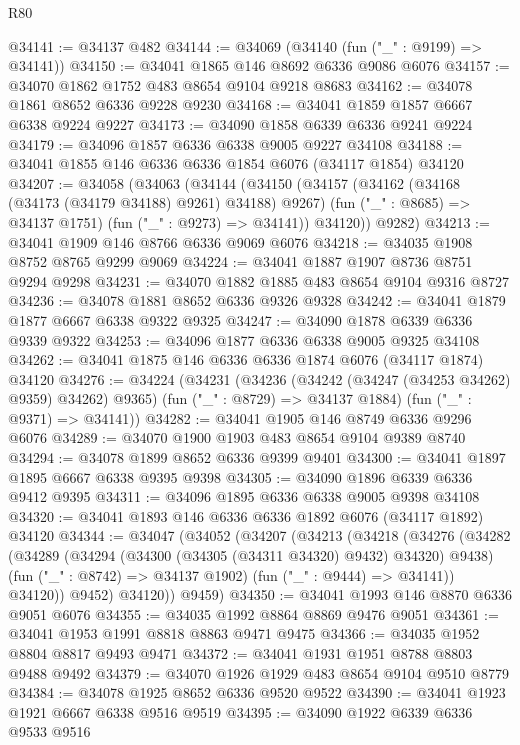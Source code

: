 \begin{lexlean}{R80}
\begin{coremodule}
@34141 := @34137 @482
@34144 := @34069 (@34140 (fun ("_" : @9199) => @34141))
@34150 := @34041 @1865 @146 @8692 @6336 @9086 @6076
@34157 := @34070 @1862 @1752 @483 @8654 @9104 @9218 @8683
@34162 := @34078 @1861 @8652 @6336 @9228 @9230
@34168 := @34041 @1859 @1857 @6667 @6338 @9224 @9227
@34173 := @34090 @1858 @6339 @6336 @9241 @9224
@34179 := @34096 @1857 @6336 @6338 @9005 @9227 @34108
@34188 := @34041 @1855 @146 @6336 @6336 @1854 @6076 (@34117 @1854) @34120
@34207 := @34058
    (@34063
      (@34144
        (@34150
          (@34157
            (@34162 (@34168 (@34173 (@34179 @34188) @9261) @34188) @9267)
            (fun ("_" : @8685) => @34137 @1751)
            (fun ("_" : @9273) => @34141))
          @34120))
      @9282)
@34213 := @34041 @1909 @146 @8766 @6336 @9069 @6076
@34218 := @34035 @1908 @8752 @8765 @9299 @9069
@34224 := @34041 @1887 @1907 @8736 @8751 @9294 @9298
@34231 := @34070 @1882 @1885 @483 @8654 @9104 @9316 @8727
@34236 := @34078 @1881 @8652 @6336 @9326 @9328
@34242 := @34041 @1879 @1877 @6667 @6338 @9322 @9325
@34247 := @34090 @1878 @6339 @6336 @9339 @9322
@34253 := @34096 @1877 @6336 @6338 @9005 @9325 @34108
@34262 := @34041 @1875 @146 @6336 @6336 @1874 @6076 (@34117 @1874) @34120
@34276 := @34224
    (@34231
      (@34236 (@34242 (@34247 (@34253 @34262) @9359) @34262) @9365)
      (fun ("_" : @8729) => @34137 @1884)
      (fun ("_" : @9371) => @34141))
@34282 := @34041 @1905 @146 @8749 @6336 @9296 @6076
@34289 := @34070 @1900 @1903 @483 @8654 @9104 @9389 @8740
@34294 := @34078 @1899 @8652 @6336 @9399 @9401
@34300 := @34041 @1897 @1895 @6667 @6338 @9395 @9398
@34305 := @34090 @1896 @6339 @6336 @9412 @9395
@34311 := @34096 @1895 @6336 @6338 @9005 @9398 @34108
@34320 := @34041 @1893 @146 @6336 @6336 @1892 @6076 (@34117 @1892) @34120
@34344 := @34047
    (@34052
      (@34207
        (@34213
          (@34218
            (@34276
              (@34282
                (@34289
                  (@34294 (@34300 (@34305 (@34311 @34320) @9432) @34320) @9438)
                  (fun ("_" : @8742) => @34137 @1902)
                  (fun ("_" : @9444) => @34141))
                @34120))
            @9452)
          @34120))
      @9459)
@34350 := @34041 @1993 @146 @8870 @6336 @9051 @6076
@34355 := @34035 @1992 @8864 @8869 @9476 @9051
@34361 := @34041 @1953 @1991 @8818 @8863 @9471 @9475
@34366 := @34035 @1952 @8804 @8817 @9493 @9471
@34372 := @34041 @1931 @1951 @8788 @8803 @9488 @9492
@34379 := @34070 @1926 @1929 @483 @8654 @9104 @9510 @8779
@34384 := @34078 @1925 @8652 @6336 @9520 @9522
@34390 := @34041 @1923 @1921 @6667 @6338 @9516 @9519
@34395 := @34090 @1922 @6339 @6336 @9533 @9516

\end{coremodule}
\end{lexlean}
